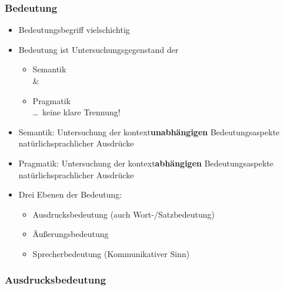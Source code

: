 \begin{frame}
\frametitle{Bedeutung}

\begin{itemize}
	\item Bedeutungsbegriff \ras vielschichtig
	\medskip
	\item Bedeutung ist Untersuchungsgegenstand der
	
	\begin{itemize}
		\item Semantik\\ \&
		\item Pragmatik\\ 
		\hfill \dots\  keine klare Trennung!
	\end{itemize}

\medskip 
	
	\item Semantik: Untersuchung der kontext\textbf{unabhängigen} Bedeutungsaspekte natürlichsprachlicher Ausdrücke
	\medskip
	\item Pragmatik: Untersuchung der kontext\textbf{abhängigen} Bedeutungsaspekte  natürlichsprachlicher Ausdrücke

\medskip
	
	\item Drei Ebenen der Bedeutung:
	
	\begin{itemize}
		\item Ausdrucksbedeutung (auch Wort-/Satzbedeutung)
		\item Äußerungsbedeutung
		\item Sprecherbedeutung (Kommunikativer Sinn)
	\end{itemize}
\end{itemize}

\end{frame}


%
\subsubsection{Ausdrucksbedeutung}
%

